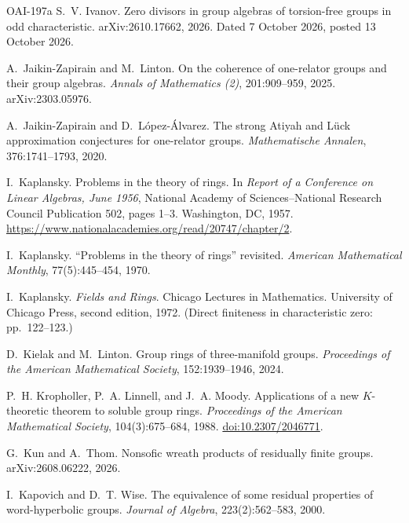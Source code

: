 \documentclass[11pt]{article}
\theoremstyle{definition}
\theoremstyle{plain}
\newcommand{\doi}[1]{\href{https://doi.org/#1}{doi:#1}}
\begin{document}
\begin{thebibliography}{OAI-197a}
S.~V. Ivanov.
\newblock Zero divisors in group algebras of torsion-free groups in odd characteristic.
\newblock arXiv:2610.17662, 2026. Dated 7 October 2026, posted 13 October 2026.

A.~Jaikin-Zapirain and M.~Linton.
\newblock On the coherence of one-relator groups and their group algebras.
\newblock \emph{Annals of Mathematics (2)}, 201:909--959, 2025. arXiv:2303.05976.

A.~Jaikin-Zapirain and D.~L\'opez-\'Alvarez.
\newblock The strong Atiyah and L\"uck approximation conjectures for one-relator groups.
\newblock \emph{Mathematische Annalen}, 376:1741--1793, 2020.

I.~Kaplansky.
\newblock Problems in the theory of rings.
\newblock In \emph{Report of a Conference on Linear Algebras, June 1956}, National Academy of Sciences--National Research Council Publication 502, pages 1--3. Washington, DC, 1957. \url{https://www.nationalacademies.org/read/20747/chapter/2}.

I.~Kaplansky.
\newblock ``Problems in the theory of rings'' revisited.
\newblock \emph{American Mathematical Monthly}, 77(5):445--454, 1970.

I.~Kaplansky.
\newblock \emph{Fields and Rings}.
\newblock Chicago Lectures in Mathematics. University of Chicago Press, second edition, 1972. (Direct finiteness in characteristic zero: pp.~122--123.)

D.~Kielak and M.~Linton.
\newblock Group rings of three-manifold groups.
\newblock \emph{Proceedings of the American Mathematical Society}, 152:1939--1946, 2024.

P.~H. Kropholler, P.~A. Linnell, and J.~A. Moody.
\newblock Applications of a new $K$-theoretic theorem to soluble group rings.
\newblock \emph{Proceedings of the American Mathematical Society}, 104(3):675--684, 1988. \doi{10.2307/2046771}.

G.~Kun and A.~Thom.
\newblock Nonsofic wreath products of residually finite groups.
\newblock arXiv:2608.06222, 2026.

I.~Kapovich and D.~T. Wise.
\newblock The equivalence of some residual properties of word-hyperbolic groups.
\newblock \emph{Journal of Algebra}, 223(2):562--583, 2000.


\end{thebibliography}
\end{document}
